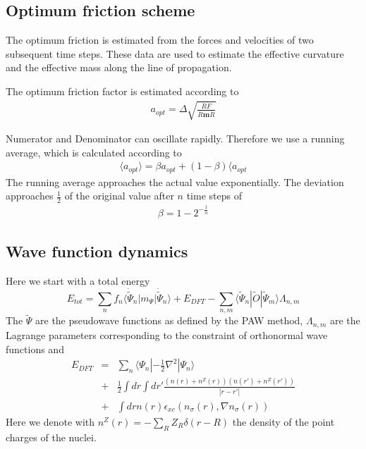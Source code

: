 \documentclass[final,12pt,makeidx,DIV=calc]{article}
\begin{document}
{{{{{{%
\subsection{Optimum friction scheme}
\label{sec:optfric}
The optimum friction is estimated from the forces and velocities of
two subsequent time steps. These data are used to estimate the
effective curvature and the effective mass along the line of
propagation.

The optimum friction factor is estimated according to
\begin{eqnarray*}
a_{opt}=\Delta\sqrt{\frac{\dot{R}\dot{F}}{\dot{R}\mathbf{m}\dot{R}}}
\end{eqnarray*}

Numerator and Denominator can oscillate rapidly. Therefore we use a
running average, which is calculated according to
\begin{eqnarray*}
\langle a_{opt}\rangle=\beta a_{opt}+(1-\beta)\langle a_{opt}
\end{eqnarray*}
The running average approaches the actual value exponentially. The
deviation approaches $\frac{1}{2}$ of the original value after $n$
time steps of
\begin{eqnarray*}
\beta=1-2^{-\frac{1}{n}}
\end{eqnarray*}


\subsection{Wave function dynamics}
Here we start with a total energy
\begin{equation}
E_{tot}=\sum_n f_n\langle\dot{\tilde\Psi}_n|m_\Psi|\dot{\tilde\Psi}_n\rangle+E_{DFT}
-\sum_{n,m} \langle\tilde\Psi_n|\tilde{O}|\tilde\Psi_m\rangle\Lambda_{n,m}
\end{equation}
The $\tilde\Psi$ are the pseudowave functions as defined by the PAW
method, $\Lambda_{n,m}$ are the Lagrange parameters corresponding to
the constraint of orthonormal wave functions and 
\begin{eqnarray*}
E_{DFT}&=&\sum_n\langle\Psi_n|-\frac{1}{2}\nabla^2|\Psi_n\rangle
\\
&+&\frac{1}{2}\int dr \int dr' \frac{(n(r)+n^Z(r))(n(r')+n^Z(r'))}{|r-r'|}
\\
&+&\int dr n(r) \epsilon_{xc}(n_\sigma(r),\nabla n_\sigma(r))
\end{eqnarray*}
Here we denote with $n^Z(r)=-\sum_R Z_R\delta(r-R)$ the density of the
point charges of the nuclei. 

}}}}}}
\end{document}
